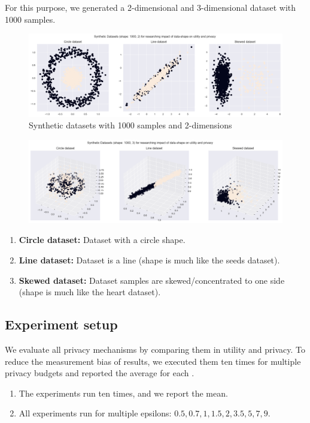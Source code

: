 For this purpose, we generated a 2-dimensional and 3-dimensional dataset with 1000 samples.
\begin{figure}[H]
      \includegraphics[width=1.0\textwidth]{Method//images/2d-shapes.png}
      \caption{Synthetic datasets with 1000 samples and 2-dimensions}
      \label{rq3:synthetic-datasets}
\end{figure}
\begin{figure}[H]
      \includegraphics[width=1.0\textwidth]{3d-shapes.png}
      \label{rq3:synthetic-datasets-3d}
\end{figure}

\begin{enumerate}
      \item \textbf{Circle dataset:} Dataset with a circle shape.
      \item \textbf{Line dataset:} Dataset is a line (shape is much like the seeds dataset).
      \item \textbf{Skewed dataset:} Dataset samples are skewed/concentrated to one side (shape is much like the heart dataset).
\end{enumerate}

\subsection{Experiment setup}
We evaluate all privacy mechanisms by comparing them in utility and privacy.
To reduce the measurement bias of results, we executed them ten times for multiple privacy budgets and reported the average for each \citep{9679364}.
\begin{enumerate}
      \item The experiments run ten times, and we report the mean.
      \item All experiments run for multiple epsilons: ${0.5, 0.7, 1, 1.5, 2, 3.5, 5, 7, 9}$.
\end{enumerate}
\newpage

